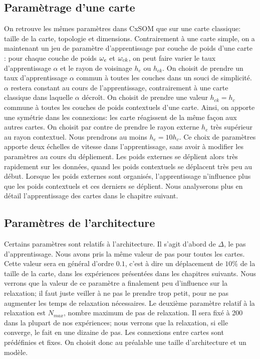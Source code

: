 \subsection{Paramètrage d'une carte}
On retrouve les mêmes paramètres dans CxSOM que sur une carte classique: taille de la carte, topologie et dimensions. 
Contrairement à une carte simple, on a maintenant un jeu de paramètre d'apprentissage par couche de poids d'une carte : pour chaque couche de poids $\omega_e$ et $\omega_{ck}$, on peut faire varier le taux d'apprentissage $\alpha$ et le rayon de voisinage $h_e$ ou $h_{ck}$.
On choisit de prendre un taux d'apprentissage $\alpha$ commun à toutes les couches dans un souci de simplicité. $\alpha$ restera constant au cours de l'apprentissage, contrairement à une carte classique dans laquelle $\alpha$ décroît.
On choisit de prendre une valeur $h_{ck} = h_c$ commune à toutes les couches de poids contextuels d'une carte. Ainsi, on apporte une symétrie dans les connexions: les carte réagissent de la même façon aux autres cartes.
On choisit par contre de prendre le rayon externe $h_e$ très supérieur au rayon contextuel. Nous prendrons au moins $h_e = 10 h_c$. Ce choix de paramètres apporte deux échelles de vitesse dans l'apprentissage, sans avoir à modifier les paramètres au cours du dépliement. Les poids externes se déplient alors très rapidement sur les données, quand les poids contextuels se déplacent très peu au début. Lorsque les poids externes sont organisés, l'apprentissage n'influence plus que les poids contextuels et ces derniers se déplient. Nous analyserons plus en détail l'apprentissage des cartes dans le chapitre suivant.

\subsection{Paramètres de l'architecture}
Certains paramètres sont relatifs à l'architecture. Il s'agit d'abord de $\Delta$, le pas d'apprentissage. Nous avons pris la même valeur de pas pour toutes les cartes. Cette valeur sera en général d'ordre $0.1$, c'est à dire un déplacement de $10\%$ de la taille de la carte, dans les expériences présentées dans les chapitres suivants. Nous verrons que la valeur de ce paramètre a finalement peu d'influence sur la relaxation; il faut juste veiller à ne pas le prendre trop petit, pour ne pas augmenter les temps de relaxation nécessaires. Le deuxième paramètre relatif à la relaxation est $N_{max}$, nombre maximum de pas de relaxation. Il sera fixé à 200 dans la plupart de nos expériences; nous verrons que la relaxation, si elle converge, le fait en une dizaine de pas.
Les connexions entre cartes sont prédéfinies et fixes. On choisit donc au préalable une taille d'architecture et un modèle. 

